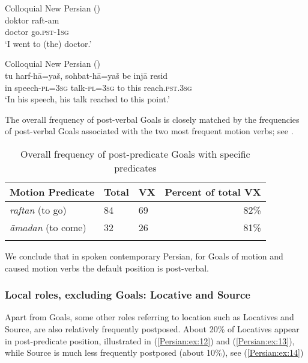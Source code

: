 \documentclass[output=paper,colorlinks,citecolor=brown,draftmode]{langscibook}
\begin{document}
\ea\label{Persian:ex:10}
Colloquial New Persian (\citealt[C, 0237]{Izadi2022Persian}) \\
\gll doktor raft-am \\
doctor go\textsc{.pst-1sg} \\
\glt `I went to (the) doctor.' 
\z

\ea\label{Persian:ex:11}
Colloquial New Persian (\citealt[ZB, 3016]{Izadi2022Persian}) \\
\gll tu harf-hā=yaš, sohbat-hā=yaš be injā resid \\
in speech\textsc{-pl=3sg} talk\textsc{-pl=3sg} to this reach\textsc{.pst.3sg} \\
\glt `In his speech, his talk reached to this point.'
\z

The overall frequency of post-verbal Goals is closely matched by the frequencies of post-verbal Goals associated with the two most frequent motion verbs; see .

\begin{table}
 \begin{tabularx}{\textwidth}{lYYr}
\lsptoprule
Motion Predicate & Total & VX & Percent of total VX \\
\midrule
\textit{raftan} (to go) & 84 & 69 & 82\% \\
\textit{āmadan} (to come) & 32 & 26 & 81\% \\
\lspbottomrule
 \end{tabularx}
 \caption{Overall frequency of post-predicate Goals with specific predicates}
 \label{Persian:tab:9}
\end{table}

We conclude that in spoken contemporary Persian, for Goals of motion and caused motion verbs the default position is post-verbal. 

\subsubsection{Local roles, excluding Goals: Locative and Source}

Apart from Goals, some other roles referring to location such as Locatives and Source, are also relatively frequently postposed. About 20\% of Locatives appear in post-predicate position, illustrated in (\ref{Persian:ex:12}) and (\ref{Persian:ex:13}), while Source is much less frequently postposed (about 10\%), see (\ref{Persian:ex:14})
\end{document}
